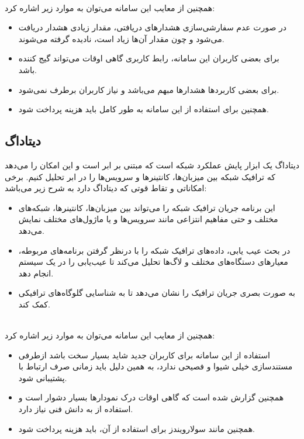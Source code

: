 \newpage
\\
همچنین از معایب این سامانه می‌توان به موارد زیر اشاره کرد:

\begin{itemize}
    \item در صورت عدم سفارشی‌سازی هشدارهای دریافتی، مقدار زیادی هشدار دریافت می‌شود و چون مقدار آن‌ها زیاد است، نادیده گرفته می‌شوند.
    \item برای بعضی کاربران این سامانه، رابط کاربری گاهی اوقات می‌تواند گیج کننده باشد.
    \item برای بعضی کاربردها هشدارها مبهم می‌باشد و نیاز کاربران برطرف نمی‌شود.
    \item همچنین برای استفاده از این سامانه به طور کامل باید هزینه پرداخت شود.
\end{itemize}


\subsection{دیتاداگ}

دیتاداگ یک ابزار پایش عملکرد شبکه است که مبتنی بر ابر است و این امکان را می‌دهد که ترافیک شبکه بین میزبان‌ها، کانتینرها و سرویس‌ها را در ابر تحلیل کنیم. برخی امکاناتی و تقاط قوتی که دیتاداگ دارد به شرح زیر می‌باشد:

\begin{itemize}
    \item این برنامه جریان ترافیک شبکه را می‌تواند بین میزبان‌ها، کانتینرها، شبکه‌های مختلف و حتی مفاهیم انتزاعی مانند سرویس‌ها و یا ماژول‌های مختلف نمایش می‌دهد. 
    \item در بحث عیب یابی، داده‌های ترافیک شبکه را با درنظر گرفتن برنامه‌های مربوطه، معیارهای دستگاه‌های مختلف و لاگ‌ها تحلیل می‌کند تا عیب‌یابی را در یک سیستم انجام دهد.
    \item به صورت بصری جریان ترافیک را نشان می‌دهد تا به شناسایی گلوگاه‌های ترافیکی کمک کند.
\end{itemize}
\\
همچنین از معایب این سامانه می‌توان به موارد زیر اشاره کرد:


\begin{itemize}
    \item استفاده از این سامانه برای کاربران جدید شاید بسیار سخت باشد ازطرفی مستندسازی خیلی شیوا و فصیحی ندارد، به همین دلیل باید زمانی صرف ارتباط با پشتیبانی شود.
    \item همچنین گزارش شده است که گاهی اوقات درک نمودارها بسیار دشوار است و استفاده از به دانش فنی نیاز دارد.
    \item همچنین مانند سولارویندز برای استفاده از آن، باید هزینه پرداخت شود.
\end{itemize}



